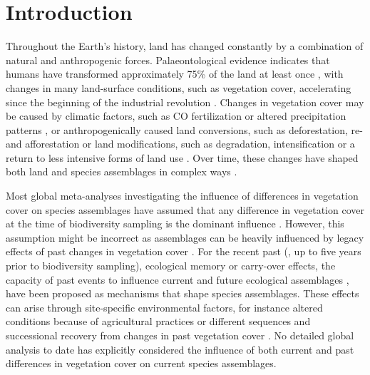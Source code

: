 \section{Introduction}
\label{C02_01}
Throughout the Earth's history, land has changed constantly by a combination of natural and anthropogenic forces. Palaeontological evidence indicates that humans have transformed approximately 75\% of the land at least once \citep{Ellis2010,Ellis2011}, with changes in many land-surface conditions, such as vegetation cover, accelerating since the beginning of the industrial revolution \citep{Lambin2006,Steffen2015}. Changes in vegetation cover may be caused by climatic factors, such as CO fertilization or altered precipitation patterns \citep{Zhu2016}, or anthropogenically caused land conversions, such as deforestation, re- and afforestation \citep{Dupont2003,Hansen2013,Muller2014} or land modifications, such as degradation, intensification \citep{Gibbs2015,Rufin2015} or a return to less intensive forms of land use \citep{Zomer2016}. Over time, these changes have shaped both land and species assemblages in complex ways \citep{Foster2003,Watson2014,Perring2015}.

Most global meta-analyses investigating the influence of differences in vegetation cover on species assemblages have assumed that any difference in vegetation cover at the time of biodiversity sampling is the dominant influence
\citep{Stein2014, Newbold2014b, Newbold2015, Alroy2017}. However, this assumption might be incorrect as assemblages can be heavily influenced by legacy effects of past changes in vegetation cover \citep{Foster2003, Watson2014, Ogle2015, Perring2015}. For the recent past (\eg, up to five years prior to biodiversity sampling), ecological memory or carry-over effects, \ie the capacity of past events to influence current and future ecological assemblages \citep{Harrison2011, OConnor2014, Ogle2015}, have been proposed as mechanisms that shape species assemblages. These effects can arise through site-specific environmental factors, for instance altered conditions because of agricultural practices \citep{Perring2015,Perring2018} or different sequences and successional recovery from changes in past vegetation cover \citep{Johnson2008,Walker2010,Watson2014}. No detailed global analysis to date has explicitly considered the influence of both current and past differences in vegetation cover on current species assemblages.


